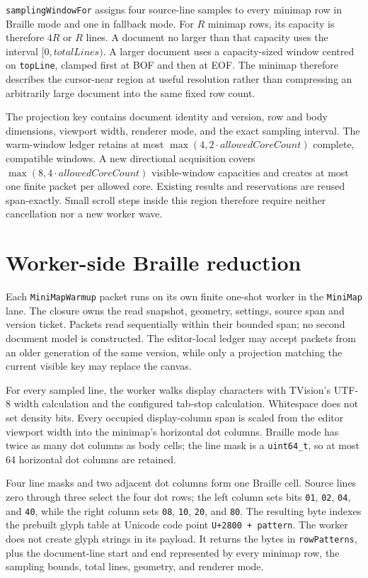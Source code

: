 \documentclass[a4paper,10pt,twoside,openany]{book}
\begin{document}
\texttt{samplingWindowFor} assigns four source-line samples to every minimap
row in Braille mode and one in fallback mode. For $R$ minimap rows, its capacity
is therefore $4R$ or $R$ lines. A document no larger than that capacity uses
the interval $[0,totalLines)$. A larger document uses a capacity-sized window
centred on \texttt{topLine}, clamped first at BOF and then at EOF. The minimap
therefore describes the cursor-near region at useful resolution rather than
compressing an arbitrarily large document into the same fixed row count.

The projection key contains document identity and version, row and body
dimensions, viewport width, renderer mode, and the exact sampling interval.
The warm-window ledger retains at most
\(\max(4,2\cdot\textit{allowedCoreCount})\) complete, compatible windows. A
new directional acquisition covers
\(\max(8,4\cdot\textit{allowedCoreCount})\) visible-window capacities and
creates at most one finite packet per allowed core. Existing results and
reservations are reused span-exactly. Small scroll steps inside this region
therefore require neither cancellation nor a new worker wave.

\section{Worker-side Braille reduction}

Each \texttt{MiniMapWarmup} packet runs on its own finite one-shot worker in the
\texttt{MiniMap} lane. The closure owns the read snapshot, geometry, settings,
source span and version ticket. Packets read sequentially within their bounded
span; no second document model is constructed. The editor-local ledger may
accept packets from an older generation of the same version, while only a
projection matching the current visible key may replace the canvas.

For every sampled line, the worker walks display characters with TVision's
UTF-8 width calculation and the configured tab-stop calculation. Whitespace
does not set density bits. Every occupied display-column span is scaled from
the editor viewport width into the minimap's horizontal dot columns. Braille
mode has twice as many dot columns as body cells; the line mask is a
\texttt{uint64\_t}, so at most 64 horizontal dot columns are retained.

Four line masks and two adjacent dot columns form one Braille cell. Source
lines zero through three select the four dot rows; the left column sets bits
\texttt{01}, \texttt{02}, \texttt{04}, and \texttt{40}, while the right column
sets \texttt{08}, \texttt{10}, \texttt{20}, and \texttt{80}. The resulting
byte indexes the prebuilt glyph table at Unicode code point
\texttt{U+2800 + pattern}. The worker does not create glyph strings in its
payload. It returns the bytes in \texttt{rowPatterns}, plus the document-line
start and end represented by every minimap row, the sampling bounds, total
lines, geometry, and renderer mode.
\end{document}
